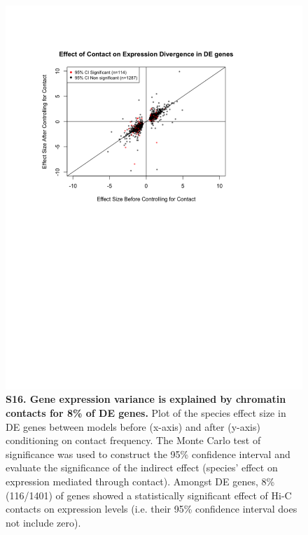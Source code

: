 \begin{figure}[!htb]
\centering
\includegraphics[width=6in]{img/figS16.pdf}
\caption[Gene expression variance is explained by chromatin contacts for 8\% of DE genes.]{\textbf{S16. Gene expression variance is explained by chromatin contacts for 8\% of DE genes.} Plot of the species effect size in DE genes between models before (x-axis) and after (y-axis) conditioning on contact frequency. The Monte Carlo test of significance was used to construct the 95\% confidence interval and evaluate the significance of the indirect effect (species' effect on expression mediated through contact). Amongst DE genes, 8\% (116/1401) of genes showed a statistically significant effect of Hi-C contacts on expression levels (i.e. their 95\% confidence interval does not include zero).}
\label{fig:figS16}
\end{figure}

